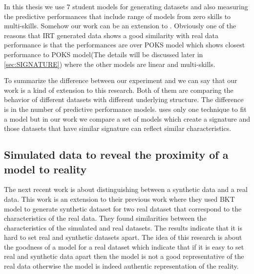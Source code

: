 In this thesis we use 7 student models for generating datasets and also measuring the predictive performances that include range of models from zero skills to multi-skills. Somehow our work can be an extension to \citep{Desmarais2010}. Obviously one of the reasons that  IRT generated data shows a good similarity with real data performance is that the performances are over POKS model which shows closest performance to POKS model(The details will be discussed later in \ref{sec:SIGNATURE}) where the other models are linear and multi-skills. 


To summarize the difference between our experiment and \citep{Desmarais2010} we can say that our work is a kind of extension to this research. Both of them are comparing the behavior of different datasets with different underlying structure. The difference is in the number of predictive performance models. \citep{Desmarais2010} uses only one technique to fit a model but in our work we compare a set of models which create a signature and those datasets that have similar signature can reflect similar characteristics.

\subsection{Simulated data to reveal the proximity of a model to reality}

The next recent work \citep{Rosenberg2015} is about distinguishing between a synthetic data and a real data. This work is an extension to their previous work \citep{Rosenberg2014} where they used BKT model to generate synthetic dataset for two real dataset that correspond to the characteristics of the real data. They found similarities between the characteristics of the simulated and real datasets. The results indicate that it is hard to set real and synthetic datasets apart. The idea of this research \citep{Rosenberg2015} is about the goodness of a model for a real dataset which indicate that if it is easy to set real and synthetic data apart then the model is not a good representative of the real data otherwise the model is indeed authentic representation of the reality.

